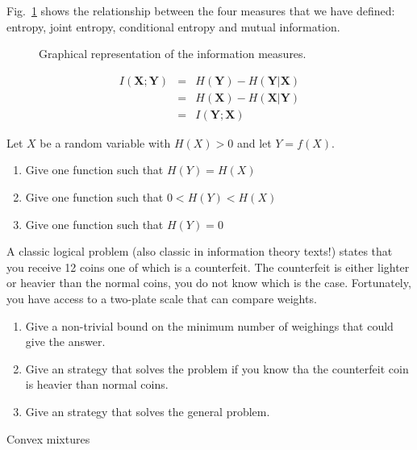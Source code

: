 Fig.~\ref{fig:infmeasures} shows the relationship between the four measures that we have defined: entropy, joint entropy, conditional entropy and mutual information.

\begin{figure}
\begin{center}
\def\svgwidth{.8\columnwidth} 
 
\caption{Graphical representation of the information measures.}
\label{fig:infmeasures}
\end{center}
\end{figure}

\begin{eqnarray}
\label{eq:mutualinformation}
I(\mathbf{X};\mathbf{Y}) &=& H(\mathbf{Y}) - H(\mathbf{Y}|\mathbf{X}) \nonumber\\
         &=& H(\mathbf{X}) - H(\mathbf{X}|\mathbf{Y}) \nonumber\\
         &=& I(\mathbf{Y};\mathbf{X})
\end{eqnarray}
\begin{exercise}
Let $X$ be a random variable with $H(X)>0$ and let $Y=f(X)$. 
\begin{enumerate}
\item Give one function such that $H(Y)=H(X)$
\item Give one function such that $0<H(Y)<H(X)$
\item Give one function such that $H(Y)=0$
\end{enumerate}
\end{exercise}
\begin{exercise}
A classic logical problem (also classic in information theory texts!) states that you receive 12 coins one of which is a counterfeit. The counterfeit is either lighter or heavier than the normal coins, you do not know which is the case. Fortunately, you have access to a two-plate scale that can compare weights.
\begin{enumerate}
\item Give a non-trivial bound on the minimum number of weighings that could give the answer.
\item Give an strategy that solves the problem if you know tha the counterfeit coin is heavier than normal coins.
\item Give an strategy that solves the general problem.
\end{enumerate}
\end{exercise}
\begin{exercise}
Convex mixtures
\end{exercise}
